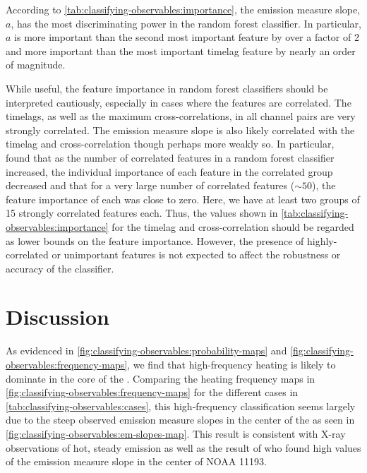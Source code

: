 According to \autoref{tab:classifying-observables:importance}, the emission measure slope, $a$, has the most discriminating power in the random forest classifier. In particular, $a$ is more important than the second most important feature by over a factor of 2 and more important than the most important timelag feature by nearly an order of magnitude.

While useful, the feature importance in random forest classifiers should be interpreted cautiously, especially in cases where the features are correlated. The timelags, as well as the maximum cross-correlations, in all channel pairs are very strongly correlated. The emission measure slope is also likely correlated with the timelag and cross-correlation though perhaps more weakly so. In particular, \citet{altmann_permutation_2010} found that as the number of correlated features in a random forest classifier increased, the individual importance of each feature in the correlated group decreased and that for a very large number of correlated features ($\sim50$), the feature importance of each was close to zero. Here, we have at least two groups of 15 strongly correlated features each. Thus, the values shown in \autoref{tab:classifying-observables:importance} for the timelag and cross-correlation should be regarded as lower bounds on the feature importance. However, the presence of highly-correlated or unimportant features is not expected to affect the robustness or accuracy of the classifier.

\section{Discussion}\label{sec:classifying-observables:discussion}

As evidenced in \autoref{fig:classifying-observables:probability-maps} and \autoref{fig:classifying-observables:frequency-maps}, we find that high-frequency heating is likely to dominate in the core of the \AR. Comparing the heating frequency maps in \autoref{fig:classifying-observables:frequency-maps} for the different cases in \autoref{tab:classifying-observables:cases}, this high-frequency classification seems largely due to the steep observed emission measure slopes in the center of the \AR{} as seen in \autoref{fig:classifying-observables:em-slopes-map}. This result is consistent with X-ray observations of hot, steady emission \citep{warren_evidence_2010,warren_constraints_2011,winebarger_using_2011} as well as the result of \citet{del_zanna_evolution_2015} who found high values of the emission measure slope in the center of NOAA 11193.

